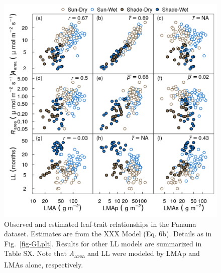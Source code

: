 \documentclass[
  12pt,
  a4paper,
,tablecaptionabove
]{scrartcl}
\begin{document}
\begin{figure}

{\centering \includegraphics{../figs/pa_point.png}

}

\caption{\label{fig-PAplt}Observed and estimated leaf-trait
relationships in the Panama dataset. Estimates are from the XXX Model
(Eq. 6b). Details as in Fig.~\ref{fig-GLplt}. Results for other LL
models are summarized in Table SX. Note that
\emph{A}\textsubscript{area} and LL were modeled by LMAp and LMAs alone,
respectively.}

\end{figure}

\newpage
\end{document}
